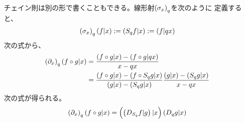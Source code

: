 {	チェイン則は別の形で書くこともできる。線形射$\plr{\sigma_x}_q$を次のように
	定義すると、
	\begin{equation*}\begin{split}
		\plr{\sigma_x}_q\plr{f|x} := \plr{S_qf|x} := \plr{f|qx}
	\end{split}\end{equation*}
	次の式から、
	\begin{equation*}\begin{split}
		\plr{\partial_x}_q\plr{f\circ g|x}
		&= \frac{\plr{f\circ g|x}-\plr{f\circ g|qx}}{x-qx} \\
		&= \frac{\plr{f\circ g|x}-\plr{f\circ S_qg|x}}{\plr{g|x} - \plr{S_qg|x}} 
			\frac{\plr{g|x} - \plr{S_qg|x}}{x - qx} \\
	\end{split}\end{equation*}
	次の式が得られる。
	\begin{equation*}\begin{split}
		\plr{\partial_x}_q\plr{f\circ g|x} 
		= \ggplr{\plr{D_{S_q}f|g}|x}\plr{D_qg|x}
	\end{split}\end{equation*}
}
